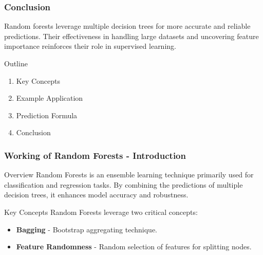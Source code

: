 \documentclass[aspectratio=169]{beamer}
\begin{document}
\begin{frame}[fragile]
    \frametitle{Conclusion}
    Random forests leverage multiple decision trees for more accurate and reliable predictions. Their effectiveness in handling large datasets and uncovering feature importance reinforces their role in supervised learning.
    \begin{block}{Outline}
        \begin{enumerate}
            \item Key Concepts
            \item Example Application
            \item Prediction Formula
            \item Conclusion
        \end{enumerate}
    \end{block}
\end{frame}

\begin{frame}[fragile]
    \frametitle{Working of Random Forests - Introduction}
    \begin{block}{Overview}
        Random Forests is an ensemble learning technique primarily used for classification and regression tasks.
        By combining the predictions of multiple decision trees, it enhances model accuracy and robustness.
    \end{block}
    \begin{block}{Key Concepts}
        Random Forests leverage two critical concepts:
        \begin{itemize}
            \item \textbf{Bagging} - Bootstrap aggregating technique.
            \item \textbf{Feature Randomness} - Random selection of features for splitting nodes.
        \end{itemize}
    \end{block}
\end{frame}
\end{document}
